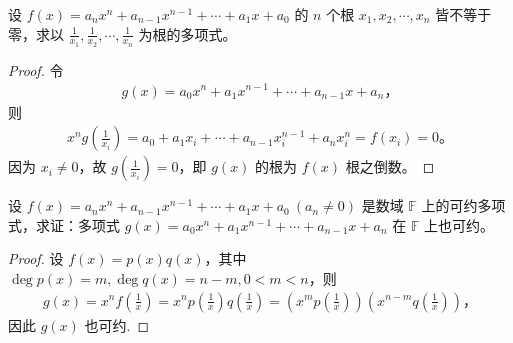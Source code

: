 \documentclass[../../main.tex]{subfiles}
\begin{document}
\begin{example}
设 $f(x) = a_n x^n + a_{n-1} x^{n-1} + \cdots + a_1 x + a_0$ 的 $n$ 个根 $x_1, x_2, \cdots, x_n$ 皆不等于零，求以 $\frac{1}{x_1}, \frac{1}{x_2}, \cdots, \frac{1}{x_n}$ 为根的多项式。
\end{example}
\begin{proof}
令
\begin{align*}
g(x) = a_0 x^n + a_1 x^{n-1} + \cdots + a_{n-1} x + a_n，
\end{align*}
则
\begin{align*}
x^n g\left(\frac{1}{x_i}\right) = a_0 + a_1 x_i + \cdots + a_{n-1} x_i^{n-1} + a_n x_i^n = f(x_i) = 0。
\end{align*}
因为 $x_i \neq 0$，故 $g\left(\frac{1}{x_i}\right) = 0$，即 $g(x)$ 的根为 $f(x)$ 根之倒数。
\end{proof}

\begin{example}
设 $f(x) = a_n x^n + a_{n-1} x^{n-1} + \cdots + a_1 x + a_0 \ (a_n \neq 0)$ 是数域 $\mathbb{F}$ 上的可约多项式，求证：多项式 $g(x) = a_0 x^n + a_1 x^{n-1} + \cdots + a_{n-1} x + a_n$ 在 $\mathbb{F}$ 上也可约。
\end{example}
\begin{proof}
设 $f(x) = p(x) q(x)$，其中 $\deg p(x) = m, \deg q(x) = n - m, 0 < m < n$，则
\begin{align*}
g(x) = x^n f\left(\frac{1}{x}\right) = x^n p\left(\frac{1}{x}\right) q\left(\frac{1}{x}\right) = \left(x^m p\left(\frac{1}{x}\right)\right) \left(x^{n-m} q\left(\frac{1}{x}\right)\right)，
\end{align*}
因此 $g(x)$ 也可约.
\end{proof}
\end{document}
